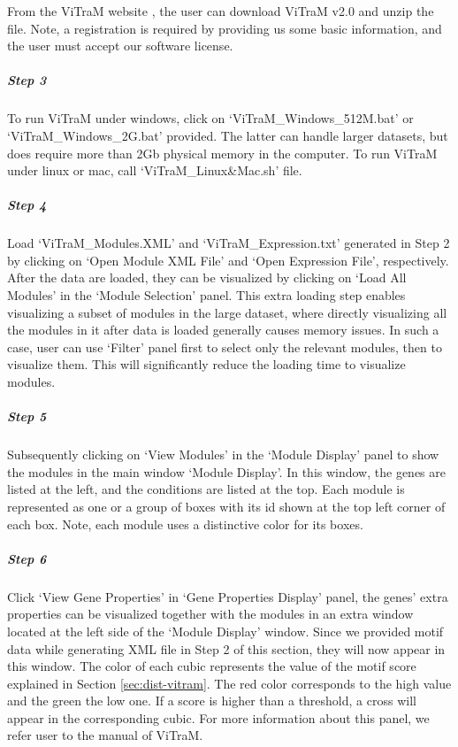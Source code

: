 From the ViTraM website \cite{ViTraM}, the user can 
download ViTraM v2.0 and unzip the file. Note, a registration is required by 
providing us some basic information, and the user must accept our software 
license.

\begin{adjustwidth}{3mm}{0cm}
\nointerlineskip\leavevmode
\subparagraph{Step 3} To run ViTraM under windows, click on 
`ViTraM\_Windows\_512M.bat' or `ViTraM\_Windows\_2G.bat' provided.
The latter can handle larger datasets, but does require more than 2Gb physical 
memory in the computer. To run ViTraM under linux or mac, call 
`ViTraM\_Linux\&Mac.sh' file.

\subparagraph{Step 4} Load `ViTraM\_Modules.XML' and 
`ViTraM\_Expression.txt' generated in Step 2 by clicking on `Open Module XML 
File' and `Open Expression File', respectively. 
After the data are loaded, they can be visualized by clicking on `Load All 
Modules' in the `Module Selection' panel. 
This extra loading step enables visualizing a subset of modules in the large 
dataset, where directly visualizing all the modules in it after data is loaded 
generally causes memory issues. 
In such a case, user can use `Filter' panel first to select only the relevant 
modules, then to visualize them. This will significantly reduce the loading 
time to visualize modules.

\subparagraph{Step 5} Subsequently clicking on `View Modules' in the 
`Module Display' panel to show the modules in the main window `Module Display'. 
In this window, the genes are listed at the left, and the conditions are listed 
at the top. Each module is represented as one or a group of boxes with 
its id shown at the top left corner of each box. Note, each module uses a 
distinctive color for its boxes.

\subparagraph{Step 6} Click `View Gene Properties' in `Gene Properties 
Display' panel, the 
genes' extra properties can be visualized together with the modules in an extra 
window located at the left side of the `Module Display' window. Since we 
provided motif data while generating XML file in Step 2 of this section, they 
will now appear in this window. The color of each cubic represents the value of 
the motif score explained in Section \ref{sec:dist-vitram}. 
The red color corresponds to the high value and the green the low one. If a 
score is higher than a threshold, a cross will appear in the corresponding 
cubic. For more information about this panel, we refer user to the manual of 
ViTraM.


\end{adjustwidth}
